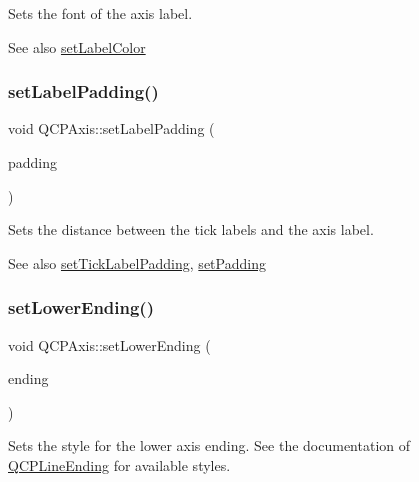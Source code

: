 Sets the font of the axis label.

\begin{DoxySeeAlso}{See also}
\mbox{\hyperlink{class_q_c_p_axis_a6c906fe56d75f0122335b9f79b999608}{set\+Label\+Color}} 
\end{DoxySeeAlso}
\mbox{\label{class_q_c_p_axis_a4391192a766e5d20cfe5cbc17607a7a2}} 
\subsubsection{\texorpdfstring{set\+Label\+Padding()}{setLabelPadding()}}
{\footnotesize\ttfamily void Q\+C\+P\+Axis\+::set\+Label\+Padding (\begin{DoxyParamCaption}\item[{int}]{padding }\end{DoxyParamCaption})}

Sets the distance between the tick labels and the axis label.

\begin{DoxySeeAlso}{See also}
\mbox{\hyperlink{class_q_c_p_axis_af302c479af9dbc2e9f0e44e07c0012ee}{set\+Tick\+Label\+Padding}}, \mbox{\hyperlink{class_q_c_p_axis_a5691441cb3de9e9844855d339c0db279}{set\+Padding}} 
\end{DoxySeeAlso}
\mbox{\label{class_q_c_p_axis_a08af1c72db9ae4dc8cb8a973d44405ab}} 
\subsubsection{\texorpdfstring{set\+Lower\+Ending()}{setLowerEnding()}}
{\footnotesize\ttfamily void Q\+C\+P\+Axis\+::set\+Lower\+Ending (\begin{DoxyParamCaption}\item[{const \mbox{\hyperlink{class_q_c_p_line_ending}{Q\+C\+P\+Line\+Ending}} \&}]{ending }\end{DoxyParamCaption})}

Sets the style for the lower axis ending. See the documentation of \mbox{\hyperlink{class_q_c_p_line_ending}{Q\+C\+P\+Line\+Ending}} for available styles.

